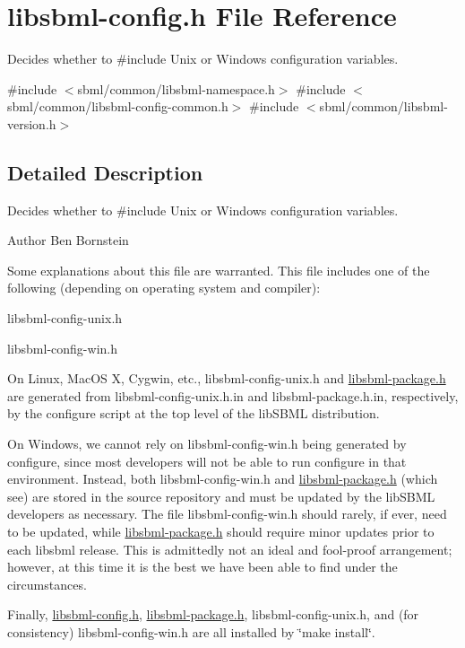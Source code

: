 \hypertarget{libsbml-config_8h}{}\section{libsbml-\/config.h File Reference}
\label{libsbml-config_8h}


Decides whether to \#include Unix or Windows configuration variables.  


{\ttfamily \#include $<$sbml/common/libsbml-\/namespace.\+h$>$}\newline
{\ttfamily \#include $<$sbml/common/libsbml-\/config-\/common.\+h$>$}\newline
{\ttfamily \#include $<$sbml/common/libsbml-\/version.\+h$>$}\newline


\subsection{Detailed Description}
Decides whether to \#include Unix or Windows configuration variables. 

\begin{DoxyAuthor}{Author}
Ben Bornstein
\end{DoxyAuthor}
Some explanations about this file are warranted. This file includes one of the following (depending on operating system and compiler)\+:


\begin{DoxyItemize}
\item {\ttfamily libsbml-\/config-\/unix.\+h}
\item {\ttfamily libsbml-\/config-\/win.\+h}
\end{DoxyItemize}

On Linux, Mac\+OS X, Cygwin, etc., {\ttfamily libsbml-\/config-\/unix.\+h} and {\ttfamily \hyperlink{libsbml-package_8h}{libsbml-\/package.\+h}} are generated from {\ttfamily libsbml-\/config-\/unix.\+h.\+in} and {\ttfamily libsbml-\/package.\+h.\+in}, respectively, by the {\ttfamily configure} script at the top level of the lib\+S\+B\+ML distribution.

On Windows, we cannot rely on {\ttfamily libsbml-\/config-\/win.\+h} being generated by {\ttfamily configure}, since most developers will not be able to run {\ttfamily configure} in that environment. Instead, both {\ttfamily libsbml-\/config-\/win.\+h} and {\ttfamily \hyperlink{libsbml-package_8h}{libsbml-\/package.\+h}} (which see) are stored in the source repository and must be updated by the lib\+S\+B\+ML developers as necessary. The file {\ttfamily libsbml-\/config-\/win.\+h} should rarely, if ever, need to be updated, while {\ttfamily \hyperlink{libsbml-package_8h}{libsbml-\/package.\+h}} should require minor updates prior to each libsbml release. This is admittedly not an ideal and fool-\/proof arrangement; however, at this time it is the best we have been able to find under the circumstances.

Finally, {\ttfamily \hyperlink{libsbml-config_8h}{libsbml-\/config.\+h}}, {\ttfamily \hyperlink{libsbml-package_8h}{libsbml-\/package.\+h}}, {\ttfamily libsbml-\/config-\/unix.\+h}, and (for consistency) {\ttfamily libsbml-\/config-\/win.\+h} are all installed by {\ttfamily \char`\"{}make install\char`\"{}}. 